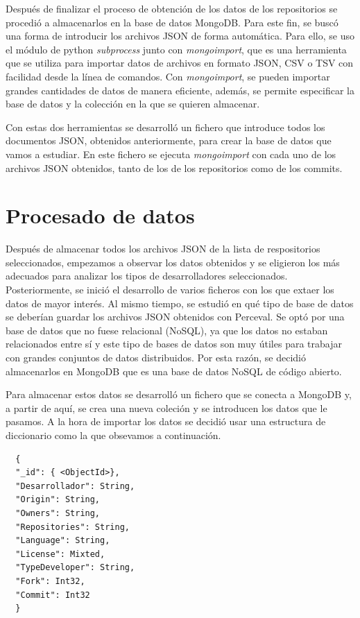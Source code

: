 \documentclass[a4paper, 12pt]{book}
\begin{document}
Después de finalizar el proceso de obtención de los datos de los repositorios se procedió a almacenarlos en la base de datos MongoDB.
Para este fin, se buscó una forma de introducir los archivos JSON de forma automática. 
Para ello, se uso el módulo de python \emph{subprocess} junto con \emph{mongoimport}, que es una herramienta que se utiliza para importar datos de archivos en formato JSON, CSV o TSV con facilidad desde la línea de comandos.
Con \emph{mongoimport}, se pueden importar grandes cantidades de datos de manera eficiente, además, se permite especificar la base de datos y la colección en la que se quieren almacenar.


Con estas dos herramientas se desarrolló un fichero que introduce todos los documentos JSON, obtenidos anteriormente, para crear la base de datos que vamos a estudiar.
En este fichero se ejecuta \emph{mongoimport} con cada uno de los archivos JSON obtenidos, tanto de los de los repositorios como de los commits.

\section{Procesado de datos} %
\label{sec:procesado de datos}

Después de almacenar todos los archivos JSON de la lista de respositorios seleccionados, empezamos a observar los datos obtenidos y se eligieron los más adecuados para analizar los tipos de desarrolladores seleccionados. 
Posteriormente, se inició el desarrollo de varios ficheros con los que extaer los datos de mayor interés. 
Al mismo tiempo, se estudió en qué tipo de base de datos se deberían guardar los archivos JSON obtenidos con Perceval.
Se optó por una base de datos que no fuese relacional (NoSQL), ya que los datos no estaban relacionados entre sí y este tipo de bases de datos son muy útiles para trabajar con grandes conjuntos de datos distribuidos.
Por esta razón, se decidió almacenarlos en MongoDB que es una base de datos NoSQL de código abierto. 

Para almacenar estos datos se desarrolló un fichero que se conecta a MongoDB y, a partir de aquí, se crea una nueva coleción y se introducen los datos que le pasamos.
A la hora de importar los datos se decidió usar una estructura de diccionario como la que obsevamos a continuación.

{\footnotesize
\begin{verbatim}
  {
  "_id": { <ObjectId>},
  "Desarrollador": String,
  "Origin": String,
  "Owners": String,
  "Repositories": String,
  "Language": String,
  "License": Mixted,
  "TypeDeveloper": String,
  "Fork": Int32,
  "Commit": Int32
  }
\end{verbatim}
}
\end{document}
